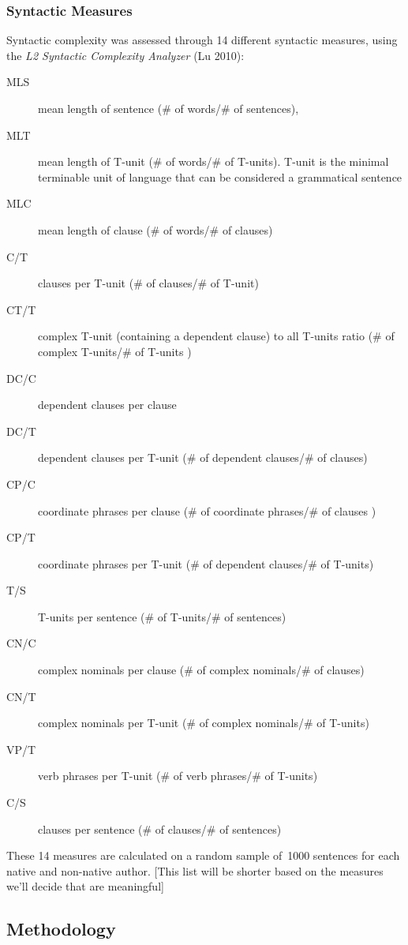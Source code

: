 \documentclass[11pt]{article}
\newcommand{\note}[1]{\textit{\small\color{magenta}{#1}}}
\begin{document}
\subsubsection{Syntactic Measures }

Syntactic complexity was assessed through 14 different syntactic measures, using the \emph{L2 Syntactic Complexity Analyzer} (Lu 2010): \note{fix ref; leave only the ones you end up using}

\begin{description}
\item[MLS] mean length of sentence (\# of words/\# of sentences), 
\item[MLT] mean length of T-unit (\# of words/\# of T-units). T-unit is the minimal terminable unit of language that can be considered a grammatical sentence 
\item[MLC] mean length of clause (\# of words/\# of clauses)
\item[C/T] clauses per T-unit (\# of clauses/\# of T-unit)
\item[CT/T] complex T-unit (containing a dependent clause) to all T-units ratio (\# of complex T-units/\# of T-units )
\item[DC/C] dependent clauses per clause
\item[DC/T] dependent clauses per T-unit (\# of dependent clauses/\# of clauses)
\item[CP/C] coordinate phrases per clause (\# of coordinate phrases/\# of clauses )
\item[CP/T] coordinate phrases per T-unit (\# of dependent clauses/\# of T-units)
\item[T/S] T-units per sentence (\# of T-units/\# of sentences)
\item[CN/C] complex nominals per clause (\# of complex nominals/\# of clauses)
\item[CN/T]  complex nominals per T-unit (\# of complex nominals/\# of T-units)
\item[VP/T] verb phrases per T-unit (\# of verb phrases/\# of T-units)
\item[C/S] clauses per sentence (\# of clauses/\# of sentences)
\end{description}

These 14 measures are calculated on a random sample of~1000 sentences for each native and non-native author. 
[This list will be shorter based on the measures we’ll decide that are meaningful]


\subsection{Methodology}
\end{document}
